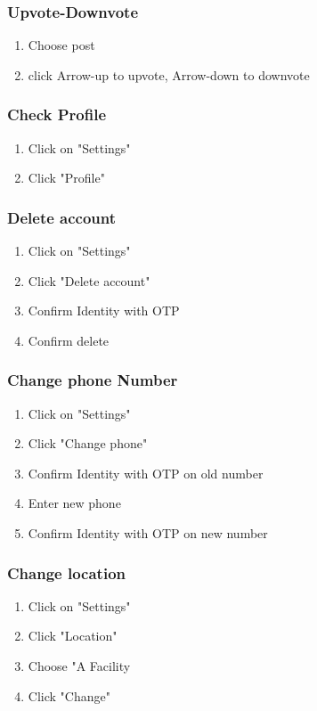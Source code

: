 \documentclass[12pt]{article}
\begin{document}
\subsubsection*{Upvote-Downvote}
\begin{enumerate}
\itemsep0em 
\item Choose post
\item click Arrow-up to upvote, Arrow-down to downvote
\end{enumerate} 
\subsubsection*{Check Profile}
\begin{enumerate}
\itemsep0em 
\item Click on "Settings"
\item Click "Profile"
\end{enumerate} 
\subsubsection*{Delete account}
\begin{enumerate}
\itemsep0em 
\item Click on "Settings"
\item Click "Delete account"
\item Confirm Identity with OTP
\item Confirm delete
\end{enumerate} 
\subsubsection*{Change phone Number}
\begin{enumerate}
\itemsep0em 
\item Click on "Settings"
\item Click "Change phone"
\item Confirm Identity with OTP on old number
\item Enter new phone
\item Confirm Identity with OTP on new number
\end{enumerate}
\subsubsection*{Change location}
\begin{enumerate}
\itemsep0em 
\item Click on "Settings"
\item Click "Location"
\item Choose "A Facility
\item Click "Change"
\end{enumerate}
\end{document}

